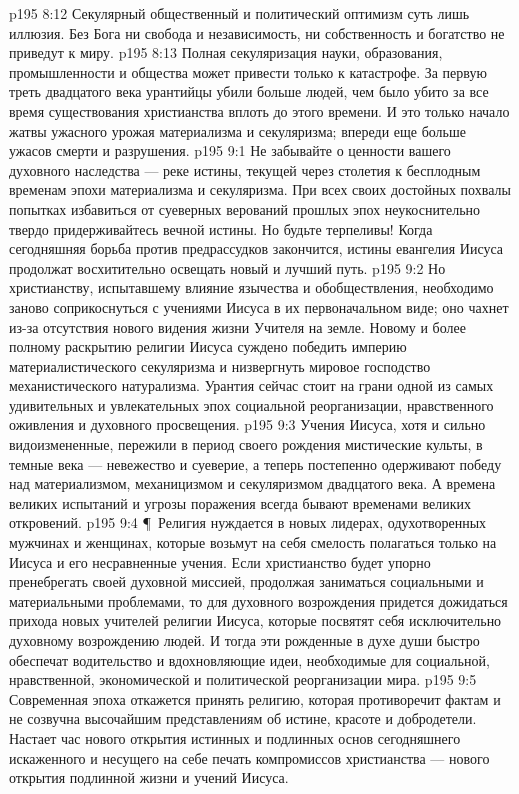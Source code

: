 \vs p195 8:12 Секулярный общественный и политический оптимизм суть лишь иллюзия. Без Бога ни свобода и независимость, ни собственность и богатство не приведут к миру.
\vs p195 8:13 Полная секуляризация науки, образования, промышленности и общества может привести только к катастрофе. За первую треть двадцатого века урантийцы убили больше людей, чем было убито за все время существования христианства вплоть до этого времени. И это только начало жатвы ужасного урожая материализма и секуляризма; впереди еще больше ужасов смерти и разрушения.
\vs p195 9:1 Не забывайте о ценности вашего духовного наследства --- реке истины, текущей через столетия к бесплодным временам эпохи материализма и секуляризма. При всех своих достойных похвалы попытках избавиться от суеверных верований прошлых эпох неукоснительно твердо придерживайтесь вечной истины. Но будьте терпеливы! Когда сегодняшняя борьба против предрассудков закончится, истины евангелия Иисуса продолжат восхитительно освещать новый и лучший путь.
\vs p195 9:2 Но христианству, испытавшему влияние язычества и обобществления, необходимо заново соприкоснуться с учениями Иисуса в их первоначальном виде; оно чахнет из\hyp{}за отсутствия нового видения жизни Учителя на земле. Новому и более полному раскрытию религии Иисуса суждено победить империю материалистического секуляризма и низвергнуть мировое господство механистического натурализма. Урантия сейчас стоит на грани одной из самых удивительных и увлекательных эпох социальной реорганизации, нравственного оживления и духовного просвещения.
\vs p195 9:3 Учения Иисуса, хотя и сильно видоизмененные, пережили в период своего рождения мистические культы, в темные века --- невежество и суеверие, а теперь постепенно одерживают победу над материализмом, механицизмом и секуляризмом двадцатого века. А времена великих испытаний и угрозы поражения всегда бывают временами великих откровений.
\vs p195 9:4 \P\ Религия нуждается в новых лидерах, одухотворенных мужчинах и женщинах, которые возьмут на себя смелость полагаться только на Иисуса и его несравненные учения. Если христианство будет упорно пренебрегать своей духовной миссией, продолжая заниматься социальными и материальными проблемами, то для духовного возрождения придется дожидаться прихода новых учителей религии Иисуса, которые посвятят себя исключительно духовному возрождению людей. И тогда эти рожденные в духе души быстро обеспечат водительство и вдохновляющие идеи, необходимые для социальной, нравственной, экономической и политической реорганизации мира.
\vs p195 9:5 Современная эпоха откажется принять религию, которая противоречит фактам и не созвучна высочайшим представлениям об истине, красоте и добродетели. Настает час нового открытия истинных и подлинных основ сегодняшнего искаженного и несущего на себе печать компромиссов христианства --- нового открытия подлинной жизни и учений Иисуса.
